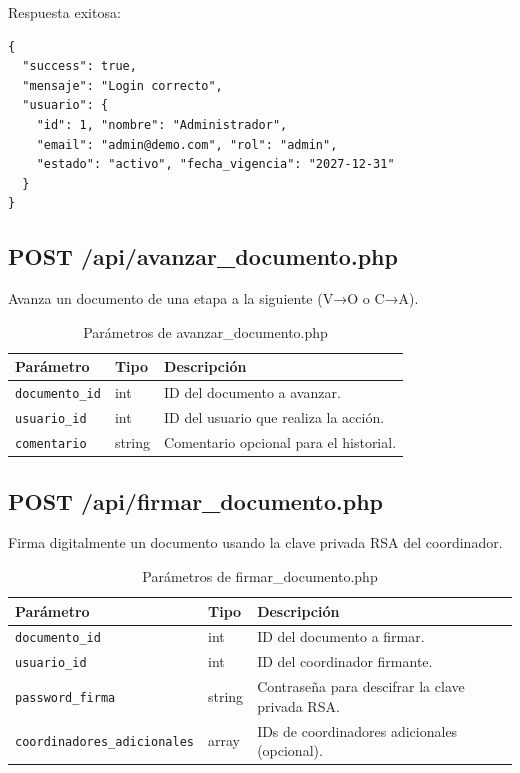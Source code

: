 \documentclass[10pt,letterpaper]{report}
\begin{document}
Respuesta exitosa:
\begin{lstlisting}[style=bashstyle]
{
  "success": true,
  "mensaje": "Login correcto",
  "usuario": {
    "id": 1, "nombre": "Administrador",
    "email": "admin@demo.com", "rol": "admin",
    "estado": "activo", "fecha_vigencia": "2027-12-31"
  }
}
\end{lstlisting}

\subsection{POST /api/avanzar\_documento.php}

Avanza un documento de una etapa a la siguiente (V→O o C→A).

\begin{table}[H]
\centering
\caption{Parámetros de avanzar\_documento.php}
\label{tab:api-avanzar}
\begin{tabular}{p{} p{} p{}}
\toprule
\textbf{Parámetro} & \textbf{Tipo} & \textbf{Descripción} \\
\midrule
\texttt{documento\_id} & int & ID del documento a avanzar. \\
\texttt{usuario\_id} & int & ID del usuario que realiza la acción. \\
\texttt{comentario} & string & Comentario opcional para el historial. \\
\bottomrule
\end{tabular}
\end{table}

\subsection{POST /api/firmar\_documento.php}

Firma digitalmente un documento usando la clave privada RSA del coordinador.

\begin{table}[H]
\centering
\caption{Parámetros de firmar\_documento.php}
\label{tab:api-firmar}
\begin{tabular}{p{} p{} p{}}
\toprule
\textbf{Parámetro} & \textbf{Tipo} & \textbf{Descripción} \\
\midrule
\texttt{documento\_id} & int & ID del documento a firmar. \\
\texttt{usuario\_id} & int & ID del coordinador firmante. \\
\texttt{password\_firma} & string & Contraseña para descifrar la clave privada RSA. \\
\texttt{coordinadores\_adicionales} & array & IDs de coordinadores adicionales (opcional). \\
\bottomrule
\end{tabular}
\end{table}
\end{document}
